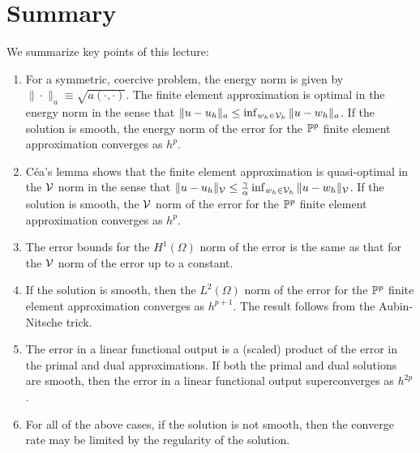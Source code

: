 \section{Summary}
We summarize key points of this lecture:
\begin{enumerate}
\item For a symmetric, coercive problem, the energy norm is given by $\| \cdot \|_a \equiv \sqrt{a(\cdot,\cdot)}$.  The finite element approximation is optimal in the energy norm in the sense that $\| u - u_h \|_a \leq \inf_{w_h \in \mathcal{V}_h} \| u - w_h \|_a$.  If the solution is smooth, the energy norm of the error for the $\mathbb{P}^p$ finite element approximation converges as $h^p$.
\item C\'ea's lemma shows that the finite element approximation is quasi-optimal in the $\mathcal{V}$ norm in the sense that $\| u - u_h \|_{\mathcal{V}} \leq \frac{\gamma}{\alpha} \inf_{w_h \in \mathcal{V}_h} \| u - w_h \|_{\mathcal{V}}$.  If the solution is smooth, the $\mathcal{V}$  norm of the error for the $\mathbb{P}^p$ finite element approximation converges as $h^p$.
\item The error bounds for the $H^1(\Omega)$ norm of the error is the same as that for the $\mathcal{V}$ norm of the error up to a constant.
\item If the solution is smooth, then the $L^2(\Omega)$ norm of the error for the $\mathbb{P}^p$ finite element approximation converges as $h^{p+1}$.  The result follows from the Aubin-Nitsche trick.
\item The error in a linear functional output is a (scaled) product of the error in the primal and dual approximations. If both the primal and dual solutions are smooth, then the error in a linear functional output superconverges as $h^{2p}$.
\item For all of the above cases, if the solution is not smooth, then the converge rate may be limited by the regularity of the solution.
\end{enumerate}
